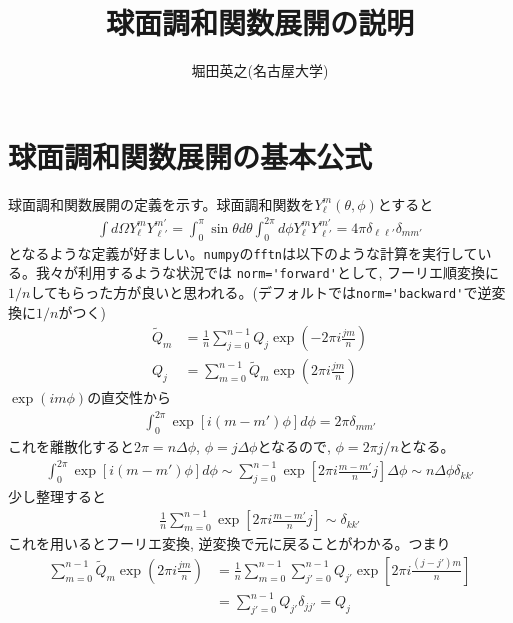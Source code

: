 \documentclass[a4j, 12pt]{ltjarticle}
\title{球面調和関数展開の説明}
\author{堀田英之(名古屋大学)}
\begin{document}
    \maketitle
    \section{球面調和関数展開の基本公式}
    球面調和関数展開の定義を示す。球面調和関数を$Y_\ell^m(\theta,\phi)$とすると
    \begin{align}
        \int d\Omega Y_{\ell}^m Y_{\ell'}^{m'} = 
        \int_0^\pi \sin\theta d\theta\int_0^{2\pi} d\phi Y_{\ell}^m Y_{\ell'}^{m'} = 4\pi\delta_{\ell\ell'}\delta_{mm'}
    \end{align}
    となるような定義が好ましい。\verb|numpy|の\verb|fftn|は以下のような計算を実行している。我々が利用するような状況では
    \verb|norm='forward'|として, フーリエ順変換に$1/n$してもらった方が良いと思われる。(デフォルトでは\verb|norm='backward'|で逆変換に$1/n$がつく)
    \begin{align}
        \tilde{Q}_m &= \frac{1}{n}\sum_{j=0}^{n-1} Q_j \exp\left(-2\pi i \frac{jm}{n}\right) \\
        Q_j &= \sum_{m=0}^{n-1} \tilde{Q}_m \exp\left(2\pi i\frac{jm}{n}\right)
    \end{align}
    $\exp(im\phi)$の直交性から
    \begin{align}
        \int_0^{2\pi} \exp\left[ i(m-m')\phi\right] d\phi = 2\pi \delta_{mm'}
    \end{align}
    これを離散化すると$2\pi=n\Delta \phi$, $\phi=j\Delta \phi$となるので, $\phi=2\pi j/n$となる。
    \begin{align}
        \int_0^{2\pi} \exp\left[ i(m-m')\phi\right] d\phi \sim
        \sum_{j=0}^{n-1} \exp\left[2\pi i \frac{m-m'}{n}j\right] \Delta \phi 
        \sim n\Delta \phi \delta_{kk'}
    \end{align}
    少し整理すると
    \begin{align}
        \frac{1}{n}\sum_{m=0}^{n-1} \exp\left[2\pi i \frac{m-m'}{n}j\right] \sim \delta_{kk'}
    \end{align}
    これを用いるとフーリエ変換, 逆変換で元に戻ることがわかる。つまり
    \begin{align}
        \sum_{m=0}^{n-1} \tilde{Q}_m \exp\left(2\pi i \frac{jm}{n}\right)
        &= \frac{1}{n}\sum_{m=0}^{n-1} \sum_{j'=0}^{n-1}Q_{j'} \exp\left[2\pi i \frac{(j-j')m}{n}\right] \\
        &= \sum_{j'=0}^{n-1}Q_{j'}\delta_{jj'} = Q_j
    \end{align}
\end{document}
